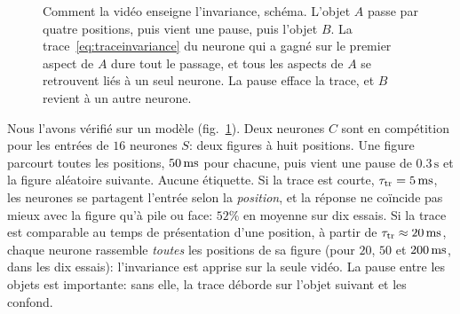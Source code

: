 \begin{figure}[t]
\centering
{}
\caption{Comment la vidéo enseigne l'invariance, schéma. L'objet $A$ passe par quatre positions, puis vient une pause, puis l'objet $B$. La trace~\eqref{eq:traceinvariance} du neurone qui a gagné sur le premier aspect de $A$ dure tout le passage, et tous les aspects de $A$ se retrouvent liés à un seul neurone. La pause efface la trace, et $B$ revient à un autre neurone.}
\label{fig:tracevideo}
\end{figure}

Nous l'avons vérifié sur un modèle (fig.~\ref{fig:tracevideo}). Deux neurones $C$ sont en compétition pour les entrées de $16$ neurones $S$: deux figures à huit positions. Une figure parcourt toutes les positions, $50\,\text{ms}$ pour chacune, puis vient une pause de $0.3\,\text{s}$ et la figure aléatoire suivante. Aucune étiquette. Si la trace est courte, $\tau_{\text{tr}}=5\,\text{ms}$, les neurones se partagent l'entrée selon la \emph{position}, et la réponse ne coïncide pas mieux avec la figure qu'à pile ou face: $52\%$ en moyenne sur dix essais. Si la trace est comparable au temps de présentation d'une position, à partir de $\tau_{\text{tr}}\approx20\,\text{ms}$, chaque neurone rassemble \emph{toutes} les positions de sa figure (pour $20$, $50$ et $200\,\text{ms}$, dans les dix essais): l'invariance est apprise sur la seule vidéo. La pause entre les objets est importante: sans elle, la trace déborde sur l'objet suivant et les confond.

